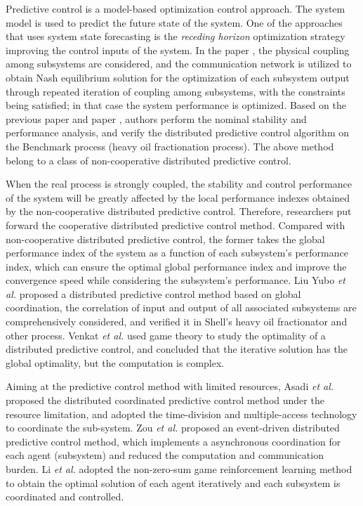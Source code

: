 \documentclass[runningheads]{llncs}
\begin{document}
Predictive control is a model-based optimization control approach. The system model is used to predict the future state of the system. One of the approaches that uses system state forecasting is the \emph{receding horizon} optimization strategy improving the control inputs of the system. In the paper \cite{dux}, the physical coupling among subsystems are considered, and the communication network is utilized to obtain Nash equilibrium solution for the optimization of each subsystem output through repeated iteration of coupling among subsystems, with the constraints being satisfied; in that case the system performance is optimized. Based on the previous paper \cite{duc} and paper \cite{lis}, authors perform the nominal stability and performance analysis, and verify the distributed predictive control algorithm on the Benchmark process (heavy oil fractionation process). The above method belong to a class of non-cooperative distributed predictive control.

When the real process is strongly coupled, the stability and control performance of the system will be greatly affected by the local performance indexes obtained by the non-cooperative distributed predictive control. Therefore, researchers put forward the cooperative distributed predictive control method. Compared with non-cooperative distributed predictive control, the former takes the global performance index of the system as a function of each subsystem's performance index, which can ensure the optimal global performance index and improve the convergence speed while considering the subsystem's performance. Liu Yubo \emph{et al.} \cite{liuy} proposed a distributed predictive control method based on global coordination, the correlation of input and output of all associated subsystems are comprehensively considered, and verified it in Shell's heavy oil fractionator and other process. Venkat \emph{et al.} \cite{venkat} used game theory to study the optimality of a distributed predictive control, and concluded that the iterative solution has the global optimality, but the computation is complex.

Aiming at the predictive control method with limited resources, Asadi \emph{et al.} \cite{asadi} proposed the distributed coordinated predictive control method under the resource limitation, and adopted the time-division and multiple-access technology to coordinate the sub-system. Zou \emph{et al.} \cite{zouyy} proposed an event-driven distributed predictive control method, which implements a asynchronous coordination for each agent (subsystem) and reduced the computation and communication burden. Li \emph{et al.} \cite{lijn} adopted the non-zero-sum game reinforcement learning method to obtain the optimal solution of each agent iteratively and each subsystem is coordinated and controlled.
\end{document}
